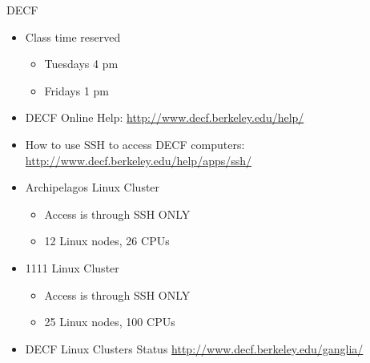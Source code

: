 \documentclass[xcolor=x11names,compress, handout]{beamer}
\renewcommand{\(}{\begin{columns}}
\renewcommand{\)}{\end{columns}}
\newcommand{\<}[1]{\begin{column}{#1}}
\renewcommand{\>}{\end{column}}
\begin{document}
\begin{frame}{DECF}

\begin{itemize}
\item Class time reserved 
  \begin{itemize}
  \item Tuesdays 4 pm
  \item Fridays 1 pm
  \end{itemize}

\item DECF Online Help: \href{http://www.decf.berkeley.edu/help/}{http://www.decf.berkeley.edu/help/}	

\item How to use SSH to access DECF computers: \href{http://www.decf.berkeley.edu/help/apps/ssh/}{http://www.decf.berkeley.edu/help/apps/ssh/}

\item Archipelagos Linux Cluster	
  \begin{itemize}
  \item Access is through SSH ONLY	
  \item 12 Linux nodes, 26 CPUs
  \end{itemize}

\item 1111 Linux Cluster		
  \begin{itemize}
  \item Access is through SSH ONLY
  \item 25 Linux nodes, 100 CPUs
  \end{itemize}

\item DECF Linux Clusters Status \href{http://www.decf.berkeley.edu/ganglia/}{http://www.decf.berkeley.edu/ganglia/}

\end{itemize}

\end{frame}
\end{document}

